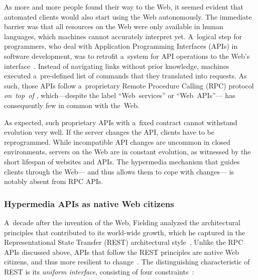 As more and more people found their way to the Web,
it seemed evident that automated clients would also start using the Web autonomously.
The immediate barrier was that all resources on the Web
were only available in human languages,
which machines cannot accurately interpret yet.
A~logical step for programmers,
who deal with Application Programming Interfaces (APIs) in software development,
was to retrofit a~system for API operations
to the Web's \http interface~\cite{HTTP}.
Instead of navigating links without prior knowledge,
machines executed a~pre-defined list of commands
that they translated into \http requests.
As such, those APIs follow a~proprietary Remote Procedure Calling (RPC) protocol
\emph{on~top~of} \http,
which---despite the label \enquote{Web~services} or \enquote{Web~{APIs}}---%
has consequently few in common with the~Web.

As expected, such proprietary APIs with a~fixed contract
cannot withstand evolution very well.
If the server changes the API,
clients have to be reprogrammed.
While incompatible API changes are uncommon in closed environments,
servers on the Web are in constant evolution,
as witnessed by the short lifespan of websites and APIs.
The hypermedia mechanism that guides clients through the Web---%
and thus allows them to cope with changes---%
is notably absent from RPC APIs.

\subsubsection{Hypermedia APIs as native Web citizens}
\label{sec:RESTConstraints}
A~decade after the invention of the Web,
Fielding analyzed the architectural principles that contributed to its world-wide growth,
which he captured in the Representational State Transfer (REST) architectural style~\cite{REST}.
Unlike the RPC APIs discussed above,
APIs that follow the REST principles are native Web citizens,
and thus more resilient to change~\cite{verborgh_jod_2014}.
The distinguishing characteristic of REST is its \emph{uniform interface},
consisting of four constraints~\cite{REST}:

